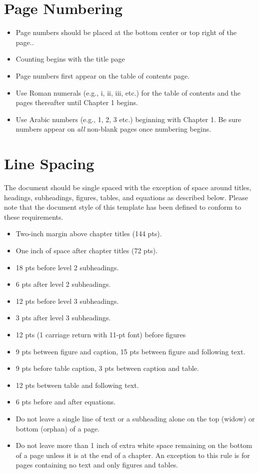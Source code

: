 	\section{Page Numbering}
	\begin{itemize}
		\item Page numbers should be placed at the bottom center or top right of the page..
		\item Counting begins with the title page
		\item Page numbers first appear on the table of contents page.
		\item Use Roman numerals (e.g., i, ii, iii, etc.) for the table of contents and the pages thereafter until Chapter 1 begins.
		\item Use Arabic numbers (e.g., 1, 2, 3 etc.) beginning with Chapter 1. Be sure numbers appear on {\em all} non-blank pages once numbering begins.
	\end{itemize}

	\section{Line Spacing}
	The document should be single spaced with the exception of space around titles, headings, subheadings, figures, tables, and equations as described below. Please note that the document style of this template  has been defined to conform to these requirements.
	\begin{itemize}
		\item Two-inch margin above chapter titles (144 pts).
		\item One inch of space after chapter titles (72 pts).
		\item 18 pts before level 2 subheadings.
		\item 6 pts after level 2 subheadings.
		\item 12 pts before level 3 subheadings.
		\item 3 pts after level 3 subheadings.
		\item 12 pts (1 carriage return with 11-pt font) before figures
		\item 9 pts between figure and caption, 15 pts between figure and following text.
		\item 9 pts before table caption, 3 pts between caption and table.
		\item 12 pts between table and following text.
		\item 6 pts before and after equations.
		\item Do not leave a single line of text or a subheading alone on the top (widow) or bottom (orphan) of a page.
		\item Do not leave more than 1 inch of extra white space remaining on the bottom of a page unless it is at the end of a chapter. An exception to this rule is for pages containing no text and only figures and tables.
	\end{itemize}
	
